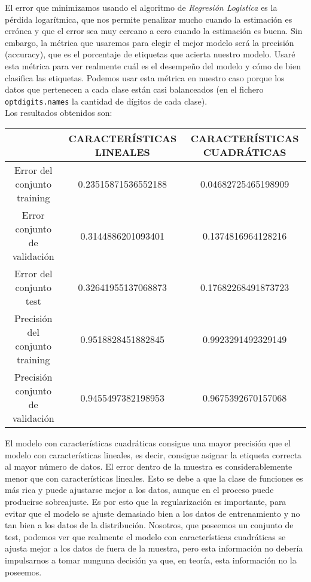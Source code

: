 \documentclass{article}
\begin{document}
El error que minimizamos usando el algoritmo de \textit{Regresión Logistica} es la pérdida logarítmica, que nos permite penalizar mucho cuando la estimación es errónea y que el error sea muy cercano a cero cuando la estimación es buena. Sin embargo, la métrica que usaremos para elegir el mejor modelo será la precisión (accuracy), que es el porcentaje de etiquetas que acierta nuestro modelo. Usaré esta métrica para ver realmente cuál es el desempeño del modelo y cómo de bien clasifica las etiquetas. Podemos usar esta métrica en nuestro caso porque los datos que pertenecen a cada clase están casi balanceados (en el fichero \texttt{optdigits.names} la cantidad de dígitos de cada clase).\\

Los resultados obtenidos son:

\begin{center}
\begin{tabular}{|c|c|c|}
\hline
\multicolumn{1}{|c|}{}& \textbf{CARACTERÍSTICAS LINEALES} &
\textbf{CARACTERÍSTICAS CUADRÁTICAS}  \\ \hline
  Error del conjunto training       & 0.23515871536552188 & 0.04682725465198909 \\
  Error conjunto de validación      & 0.3144886201093401  & 0.1374816964128216 \\
  Error del conjunto test           & 0.32641955137068873 & 0.17682268491873723 \\
  Precisión del conjunto training   & 0.9518828451882845  & 0.9923291492329149 \\
  Precisión conjunto de validación  & 0.9455497382198953  & 0.9675392670157068 \\ \hline
\end{tabular}
\end{center}

El modelo con características cuadráticas consigue una mayor precisión que el modelo con características lineales, es decir, consigue asignar la etiqueta correcta al mayor número de datos. El error dentro de la muestra es considerablemente menor que con características lineales. Esto se debe a que la clase de funciones es más rica y puede ajustarse mejor a los datos, aunque en el proceso puede producirse sobreajuste. Es por esto que la regularización es importante, para evitar que el modelo se ajuste demasiado bien a los datos de entrenamiento y no tan bien a los datos de la distribución. Nosotros, que poseemos un conjunto de test, podemos ver que realmente el modelo con características cuadráticas se ajusta mejor a los datos de fuera de la muestra, pero esta información no debería impulsarnos a tomar nunguna decisión ya que, en teoría, esta información no la poseemos.\\
\end{document}
